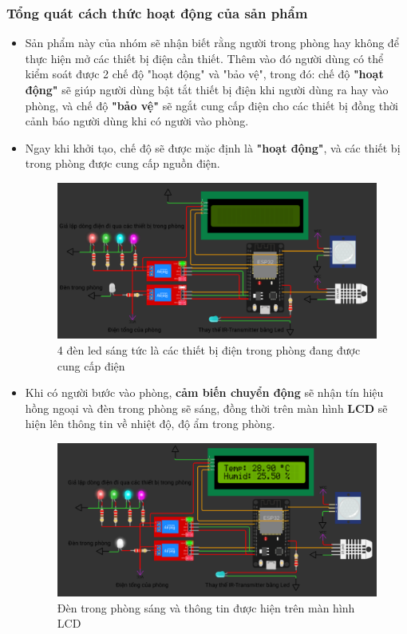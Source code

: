 \documentclass{report}
\begin{document}
\subsubsection{Tổng quát cách thức hoạt động của sản phẩm}
\begin{itemize}
    \item Sản phẩm này của nhóm sẽ nhận biết rằng người trong phòng hay không để thực hiện mở các thiết bị điện cần thiết. Thêm vào đó người dùng có thể kiểm soát được 2 chế độ "hoạt động" và "bảo vệ", trong đó: chế độ \textbf{"hoạt động"} sẽ giúp người dùng bật tắt thiết bị điện khi người dùng ra hay vào phòng, và chế độ \textbf{"bảo vệ"} sẽ ngắt cung cấp điện cho các thiết bị đồng thời cảnh báo người dùng khi có người vào phòng.

    \item Ngay khi khởi tạo, chế độ sẽ được mặc định là \textbf{"hoạt động"}, và các thiết bị trong phòng được cung cấp nguồn điện.

    \begin{figure}[!h]
        \centering
        \includegraphics[width=\textwidth, keepaspectratio]{Khoi_tao.png}
        \caption{4 đèn led sáng tức là các thiết bị điện trong phòng đang được cung cấp điện}
    \end{figure}

    \pagebreak
    \item Khi có người bước vào phòng, \textbf{cảm biến chuyển động} sẽ nhận tín hiệu hồng ngoại và đèn trong phòng sẽ sáng, đồng thời trên màn hình \textbf{LCD} sẽ hiện lên thông tin về nhiệt độ, độ ẩm trong phòng.

    \begin{figure}[!h]
        \centering
        \includegraphics[width=\textwidth, keepaspectratio]{vao_phong.png}
        \caption{Đèn trong phòng sáng và thông tin được hiện trên màn hình LCD}
    \end{figure}


\end{itemize}
\end{document}
